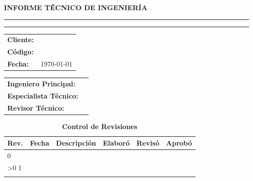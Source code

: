 \begin{titlepage}
	\thispagestyle{corporativo}

	\centering
	\vspace*{\portadaVspaceA}

	{\Large\bfseries INFORME TÉCNICO DE INGENIERÍA}

	\vspace{1cm}
	\rule{\linewidth}{0.4pt}

	\vspace{0.6cm}
	{\huge\bfseries \projecttitle}

	\vspace{0.6cm}
	\rule{\linewidth}{0.4pt}

	\vspace{\portadaVspaceB}

	\begin{table}[h]
		\raggedright
		\begin{tabular}{@{}ll@{}}
			\toprule
			\rowcolor{green!15}
			\textbf{Cliente:} & \targetcompany \\
			\textbf{Código:} & \documentcode \\
			\textbf{Fecha:} & \today \\
			\bottomrule
		\end{tabular}
	\end{table}

	\vspace{\portadaVspaceB}

	\begin{table}[h]
		\raggedright
		\begin{tabular}{@{}ll@{}}
			\toprule
			\rowcolor{green!15}
			\textbf{Ingeniero Principal:} & \firmaAprobo \\
			\textbf{Especialista Técnico:} & \firmaElaboro \\
			\textbf{Revisor Técnico:} & \firmaReviso \\
			\bottomrule
		\end{tabular}
	\end{table}

	\vfill

	\begin{table}[h]
		\centering
		\caption*{\textbf{Control de Revisiones}}
		\label{tab:control_revisiones}
		\begin{tabularx}{\textwidth}{@{}llXlll@{}}
			\toprule
			\rowcolor{green!15}
			\textbf{Rev.} & \textbf{Fecha} & \textbf{Descripción} & \textbf{Elaboró} & \textbf{Revisó} & \textbf{Aprobó} \\
			\midrule
			0 & \fechaRevCero & \descRevCero & \firmaElaboro & \firmaReviso & \firmaAprobo \\
			\ifnum\docRevision>0
			1 & \fechaRevUno & \descRevUno & \firmaElaboro & \firmaReviso & \firmaAprobo \\
			\fi
			\bottomrule
		\end{tabularx}
	\end{table}

\end{titlepage}

\newpage